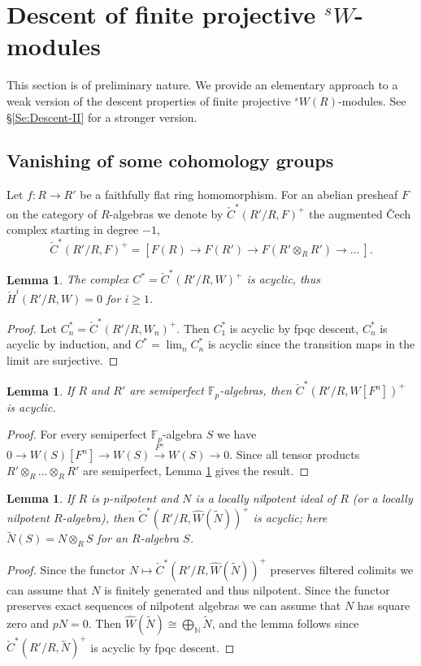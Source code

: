 \documentclass[a4paper,11pt]{amsart}
\theoremstyle{plain}
\newtheorem{Lemma}[equation]{Lemma}
\theoremstyle{definition}
\theoremstyle{remark}
\newcommand{\bLe}{\begin{Lemma}}
\newcommand{\eLe}{\end{Lemma}}
\newcommand{\bproof}{\begin{proof}}
\newcommand{\eproof}{\end{proof}}
\numberwithin{equation}{section}
\newcommand{\FF}{{\mathbb{F}}}
\newcommand{\NN}{{\mathbb{N}}}
\newcommand{\sW}{{}^sW}
\newcommand{\cclearpage}{}%
\begin{document}
\cclearpage
\section{Descent of finite projective $\sW$-modules}

This section is of preliminary nature. We provide an elementary approach to a weak version of the descent properties of finite projective $\sW(R)$-modules. See \S\ref{Se:Descent-II} for a stronger version.

\subsection{Vanishing of some cohomology groups}

Let $f\colon R\to R'$ be a faithfully flat ring homomorphism. For an abelian presheaf $F$ on the category of $R$-algebras we denote by 
$\check C^*(R'/R,F)^+$ the augmented \v Cech complex starting in degree $-1$,
\[
\check C^*(R'/R,F)^+=[ F(R)\to F(R')\to F(R'\otimes_RR')\to\ldots\ ].
\]

\bLe
\label{Le:H*W-fpqc}
The complex $C^*=\check C^*(R'/R,W)^+$ is acyclic, thus $\check H^i(R'/R,W)=0$ for $i\ge 1$.
\eLe

\bproof
Let $C^*_n=\check C^*(R'/R,W_n)^+$. Then $C_1^*$ is acyclic by fpqc descent, $C_n^*$ is acyclic by induction, and $C^*=\lim_n C^*_n$ is acyclic since the transition maps in the limit are surjective.
\eproof

\bLe
\label{Le:H*WFn-fpqc}
If $R$ and $R'$ are semiperfect $\FF_p$-algebras, then $\check C^*(R'/R,W[{F^n}])^+$ is acyclic.
\eLe

\bproof
For every semiperfect $\FF_p$-algebra $S$ we have $0\to W(S)[{F^n}]\to W(S)\xrightarrow{F^n} W(S)\to 0$. Since all tensor products $R'\otimes_R\ldots\otimes_RR'$ are semiperfect, Lemma \ref{Le:H*W-fpqc} gives the result.
\eproof

\bLe
\label{Le:H*hWN-fpqc}
If $R$ is $p$-nilpotent and $N$ is a locally nilpotent ideal of $R$ (or a locally nilpotent $R$-algebra), then $\check C^*(R'/R,\hat W(\tilde N))^+$ is acyclic; here $\tilde N(S)=N\otimes_RS$ for an $R$-algebra $S$. 
\eLe

\bproof
Since the functor $N\mapsto \check C^*(R'/R,\hat W(\tilde N))^+$ preserves filtered colimits we can assume that $N$ is finitely generated and thus nilpotent. Since the functor preserves exact sequences of nilpotent algebras we can assume that $N$ has square zero and $pN=0$. Then $\hat W(\tilde N)\cong\bigoplus_{\NN}\tilde N$, and the lemma follows since $\check C^*(R'/R,\tilde N)^+$ is acyclic by fpqc descent.
\eproof
\end{document}
